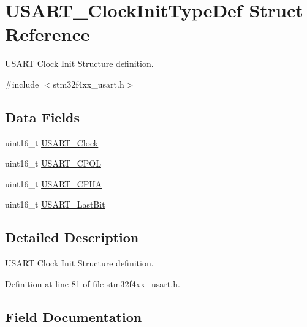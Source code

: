 \hypertarget{struct_u_s_a_r_t___clock_init_type_def}{}\section{U\+S\+A\+R\+T\+\_\+\+Clock\+Init\+Type\+Def Struct Reference}
\label{struct_u_s_a_r_t___clock_init_type_def}


U\+S\+A\+RT Clock Init Structure definition.  




{\ttfamily \#include $<$stm32f4xx\+\_\+usart.\+h$>$}

\subsection*{Data Fields}
\begin{DoxyCompactItemize}
\item 
uint16\+\_\+t \hyperlink{struct_u_s_a_r_t___clock_init_type_def_a17b0a201922d9d4bad57583b9766904a}{U\+S\+A\+R\+T\+\_\+\+Clock}
\item 
uint16\+\_\+t \hyperlink{struct_u_s_a_r_t___clock_init_type_def_ab6507c7489a2e05e4ef1ade9fbf057d5}{U\+S\+A\+R\+T\+\_\+\+C\+P\+OL}
\item 
uint16\+\_\+t \hyperlink{struct_u_s_a_r_t___clock_init_type_def_ae8d00e2e6f99439097a1b56cd33dd9f4}{U\+S\+A\+R\+T\+\_\+\+C\+P\+HA}
\item 
uint16\+\_\+t \hyperlink{struct_u_s_a_r_t___clock_init_type_def_a998735e29b6f77d3e993d8d34c74cbca}{U\+S\+A\+R\+T\+\_\+\+Last\+Bit}
\end{DoxyCompactItemize}


\subsection{Detailed Description}
U\+S\+A\+RT Clock Init Structure definition. 

Definition at line 81 of file stm32f4xx\+\_\+usart.\+h.



\subsection{Field Documentation}
\mbox{\label{struct_u_s_a_r_t___clock_init_type_def_a17b0a201922d9d4bad57583b9766904a}} 
